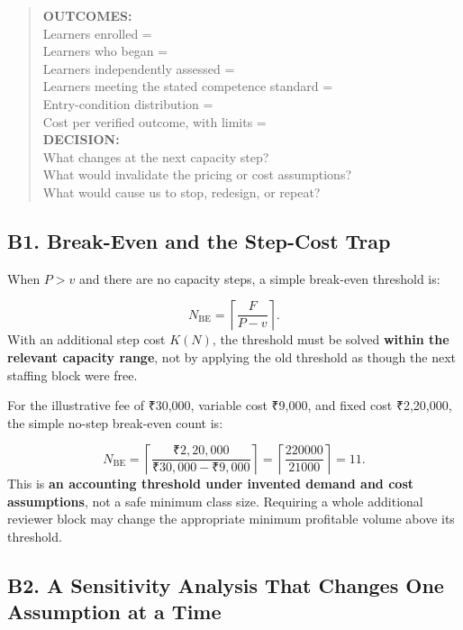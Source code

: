 \begin{quote}
\textbf{OUTCOMES:}\\
Learners enrolled =\\
Learners who began =\\
Learners independently assessed =\\
Learners meeting the stated competence standard =\\
Entry-condition distribution =\\
Cost per verified outcome, with limits =\\[1ex]
\textbf{DECISION:}\\
What changes at the next capacity step?\\
What would invalidate the pricing or cost assumptions?\\
What would cause us to stop, redesign, or repeat?
\end{quote}

\subsection*{B1. Break-Even and the Step-Cost Trap}

When $P>v$ and there are no capacity steps, a simple break-even threshold is:

\begin{equation}
N_{\text{BE}} = \left\lceil \frac{F}{P-v} \right\rceil.
\end{equation}
With an additional step cost $K(N)$, the threshold must be solved \textbf{within the relevant capacity range}, not by applying the old threshold as though the next staffing block were free.

For the illustrative fee of ₹30,000, variable cost ₹9,000, and fixed cost ₹2,20,000, the simple no-step break-even count is:

\begin{equation}
N_{\text{BE}} = \left\lceil \frac{₹2{,}20{,}000}{₹30{,}000 - ₹9{,}000} \right\rceil = \left\lceil \frac{220000}{21000} \right\rceil = 11.
\end{equation}
This is \textbf{an accounting threshold under invented demand and cost assumptions}, not a safe minimum class size. Requiring a whole additional reviewer block may change the appropriate minimum profitable volume above its threshold.

\subsection*{B2. A Sensitivity Analysis That Changes One Assumption at a Time}

